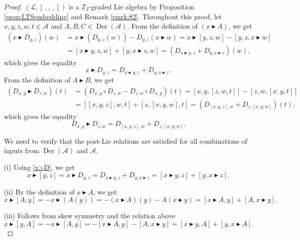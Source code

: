 \documentclass[10pt,a4paper]{amsart}
\newcommand{\Der}{\operatorname{Der}}
\newcommand{\noarg}{\,\_\,}
\numberwithin{equation}{section}
\begin{document}
\begin{proof}
$(\mathcal{L},[\noarg,\noarg])$ is a $\mathbb{Z}_2$-graded Lie algebra by Proposition \ref{prop:LTSembedding} and Remark \ref{rmrk:82}. Throughout this proof, let $x,y,z,w,t \in \mathcal{A}$ and $A,B,C \in \Der(\mathcal{A})$. From the definition of $(x\blacktriangleright A)$, we get
\begin{align*}
 (x \blacktriangleright D_{y,z})(w) & = x \blacktriangleright (D_{y,z}(w)) - D_{y,z}(x\blacktriangleright w)
 = x \blacktriangleright [y,z,w] - [y,z,x \blacktriangleright w] \\
 & = [x \blacktriangleright y, z, w] + [y,x\blacktriangleright z, w]
 = (D_{x\blacktriangleright y,z} + D_{y,x \blacktriangleright z})(w),
\end{align*}
which gives the equality
\begin{equation}\label{x>D}
 x \blacktriangleright D_{y,z} = D_{x\blacktriangleright y,z} + D_{y,x \blacktriangleright z}.
\end{equation}
From the definition of $A\blacktriangleright B$, we get
\begin{align*}
 (D_{x,y}\blacktriangleright D_{z,w})(t) & = (D_{x,y} \circ D_{z,w} - D_{z,w} \circ D_{x,y})(t)
 = [x,y,[z,w,t]] - [z,w,[x,y,t]] \\
 & = [[x,y,z],w,t] + [z,[x,y,w],t]
 = (D_{[x,y,z],w} + D_{z,[x,y,w]})(t),
\end{align*}
which gives the equality
\begin{equation}\label{A>B}
 D_{x,y}\blacktriangleright D_{z,w} = D_{[x,y,z],w} + D_{z,[x,y,w]}.
\end{equation}

We need to verify that the post-Lie relations are satisfied for all combinations of inputs from $\Der(\mathcal{A})$ and $\mathcal{A}$.

(i) Using \eqref{x>D}, we get
 \[
 x \blacktriangleright [y,z] = x \blacktriangleright D_{y,z} = D_{x \blacktriangleright y,z} + D_{y,x \blacktriangleright z} = [x \blacktriangleright y,z ] + [y, x\blacktriangleright z].
 \]

(ii) By the definition of $x \blacktriangleright A$, we get
 \[
 x \blacktriangleright [A,y] = - x \blacktriangleright(A(y)) = -(x\blacktriangleright A)(y) - A(x\blacktriangleright y) = [x \blacktriangleright A ,y] + [A, x \blacktriangleright y].
 \]

(iii) Follows from skew symmetry and the relation above
 \[
 x \blacktriangleright [y,A] = -x \blacktriangleright [A,y] = - [x \blacktriangleright A ,y] - [A, x \blacktriangleright y] = [x \blacktriangleright y,A] + [y, x \blacktriangleright A].
 \]


\end{proof}
\end{document}
